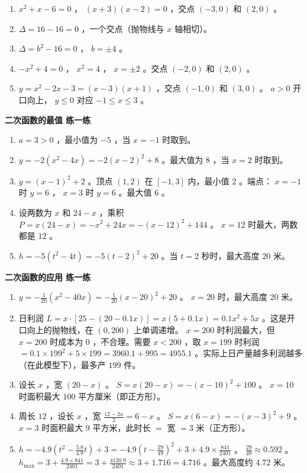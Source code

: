 \begin{answer}
\begin{enumerate}
  \item $x^2 + x - 6 = 0$ ， $(x+3)(x-2) = 0$ ，交点 $(-3, 0)$ 和 $(2, 0)$ 。
  \item $\Delta = 16 - 16 = 0$ ，一个交点（抛物线与 $x$ 轴相切）。
  \item $\Delta = b^2 - 16 = 0$ ， $b = \pm 4$ 。
  \item $-x^2 + 4 = 0$ ， $x^2 = 4$ ， $x = \pm 2$ 。交点 $(-2, 0)$ 和 $(2, 0)$ 。
  \item $y = x^2 - 2x - 3 = (x-3)(x+1)$ ，交点 $(-1, 0)$ 和 $(3, 0)$ 。 $a > 0$ 开口向上， $y \leq 0$ 对应 $-1 \leq x \leq 3$ 。
\end{enumerate}


\textbf{二次函数的最值 练一练}

\begin{enumerate}
  \item $a = 3 > 0$ ，最小值为 $-5$ ，当 $x = -1$ 时取到。
  \item $y = -2(x^2 - 4x) = -2(x-2)^2 + 8$ 。最大值为 $8$ ，当 $x = 2$ 时取到。
  \item $y = (x-1)^2 + 2$ 。顶点 $(1, 2)$ 在 $[-1, 3]$ 内，最小值 $2$ 。端点： $x = -1$ 时 $y = 6$ ， $x = 3$ 时 $y = 6$ 。最大值 $6$ 。
  \item 设两数为 $x$ 和 $24 - x$ ，乘积 $P = x(24-x) = -x^2 + 24x = -(x-12)^2 + 144$ 。 $x = 12$ 时最大，两数都是 $12$ 。
  \item $h = -5(t^2 - 4t) = -5(t-2)^2 + 20$ 。当 $t = 2$ 秒时，最大高度 $20$ 米。
\end{enumerate}


\textbf{二次函数的应用 练一练}

\begin{enumerate}
  \item $y = -\frac{1}{20}(x^2 - 40x) = -\frac{1}{20}(x - 20)^2 + 20$ 。 $x = 20$ 时，最大高度 $20$ 米。
  \item 日利润 $L = x \cdot [25 - (20 - 0.1x)] = x(5 + 0.1x) = 0.1x^2 + 5x$ 。这是开口向上的抛物线，在 $(0, 200)$ 上单调递增。 $x = 200$ 时利润最大，但 $x = 200$ 时成本为 $0$ ，不合理。需要 $x < 200$ ，取 $x = 199$ 时利润 $= 0.1 \times 199^2 + 5 \times 199 = 3960.1 + 995 = 4955.1$ 。实际上日产量越多利润越多（在此模型下），最多产 $199$ 件。
  \item 设长 $x$ ，宽 $(20 - x)$ 。 $S = x(20 - x) = -(x - 10)^2 + 100$ 。 $x = 10$ 时面积最大 $100$ 平方厘米（即正方形）。
  \item 周长 $12$ ，设长 $x$ ，宽 $\frac{12 - 2x}{2} = 6 - x$ 。 $S = x(6 - x) = -(x - 3)^2 + 9$ 。 $x = 3$ 时面积最大 $9$ 平方米，此时长 $= $ 宽 $= 3$ 米（正方形）。
  \item $h = -4.9(t^2 - \frac{5.8}{4.9}t) + 3 = -4.9\left(t - \frac{29}{49}\right)^2 + 3 + 4.9 \times \frac{841}{2401}$ 。 $\frac{29}{49} \approx 0.592$ 。 $h_{\max} = 3 + \frac{4.9 \times 841}{2401} = 3 + \frac{4120.9}{2401} \approx 3 + 1.716 = 4.716$ 。最大高度约 $4.72$ 米。
\end{enumerate}


\end{answer}
